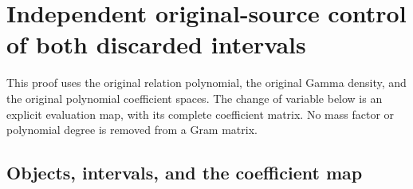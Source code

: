 \section{Independent original-source control of both discarded intervals}

This proof uses the original relation polynomial, the original Gamma density,
and the original polynomial coefficient spaces.  The change of variable below
is an explicit evaluation map, with its complete coefficient matrix.  No
mass factor or polynomial degree is removed from a Gram matrix.

\subsection{Objects, intervals, and the coefficient map}

